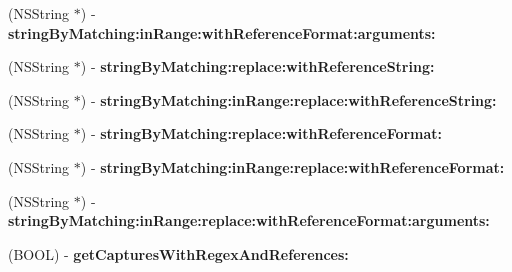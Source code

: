 \begin{DoxyCompactItemize}
\item 
\hypertarget{interface_n_s_string_07_regex_kit_additions_08_a9b8a72142b5c51c7692e56038a3fc91e}{(N\-S\-String $\ast$) -\/ {\bfseries string\-By\-Matching\-:in\-Range\-:with\-Reference\-Format\-:arguments\-:}}\label{interface_n_s_string_07_regex_kit_additions_08_a9b8a72142b5c51c7692e56038a3fc91e}

\item 
\hypertarget{interface_n_s_string_07_regex_kit_additions_08_a3f51f5ce2ed14f1763dbdfbd002db51c}{(N\-S\-String $\ast$) -\/ {\bfseries string\-By\-Matching\-:replace\-:with\-Reference\-String\-:}}\label{interface_n_s_string_07_regex_kit_additions_08_a3f51f5ce2ed14f1763dbdfbd002db51c}

\item 
\hypertarget{interface_n_s_string_07_regex_kit_additions_08_aeabaa7f5d347f24311f8de8f990b82ce}{(N\-S\-String $\ast$) -\/ {\bfseries string\-By\-Matching\-:in\-Range\-:replace\-:with\-Reference\-String\-:}}\label{interface_n_s_string_07_regex_kit_additions_08_aeabaa7f5d347f24311f8de8f990b82ce}

\item 
\hypertarget{interface_n_s_string_07_regex_kit_additions_08_aafa2e718ee6cca45bb63816872fc005f}{(N\-S\-String $\ast$) -\/ {\bfseries string\-By\-Matching\-:replace\-:with\-Reference\-Format\-:}}\label{interface_n_s_string_07_regex_kit_additions_08_aafa2e718ee6cca45bb63816872fc005f}

\item 
\hypertarget{interface_n_s_string_07_regex_kit_additions_08_a9e8bd0577e98bea491b10eac648a3e1f}{(N\-S\-String $\ast$) -\/ {\bfseries string\-By\-Matching\-:in\-Range\-:replace\-:with\-Reference\-Format\-:}}\label{interface_n_s_string_07_regex_kit_additions_08_a9e8bd0577e98bea491b10eac648a3e1f}

\item 
\hypertarget{interface_n_s_string_07_regex_kit_additions_08_af72979ecf53901259ebe5922745442eb}{(N\-S\-String $\ast$) -\/ {\bfseries string\-By\-Matching\-:in\-Range\-:replace\-:with\-Reference\-Format\-:arguments\-:}}\label{interface_n_s_string_07_regex_kit_additions_08_af72979ecf53901259ebe5922745442eb}

\item 
\hypertarget{interface_n_s_string_07_regex_kit_additions_08_a67b1aab5c9832ed1582d21facce6cf9e}{(B\-O\-O\-L) -\/ {\bfseries get\-Captures\-With\-Regex\-And\-References\-:}}\label{interface_n_s_string_07_regex_kit_additions_08_a67b1aab5c9832ed1582d21facce6cf9e}


\end{DoxyCompactItemize}
